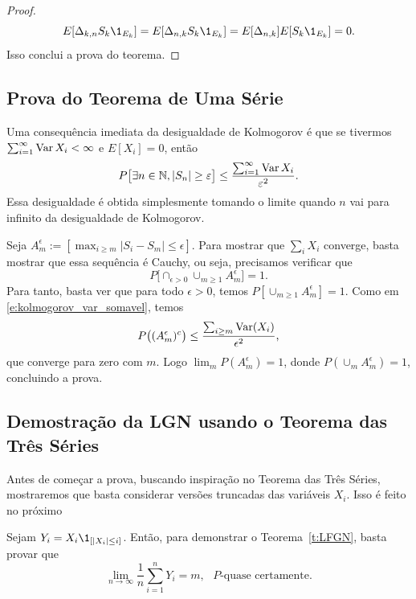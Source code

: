 \begin{topics}
\begin{proof}
 \begin{equation}
   E[ \Delta_{k,n} S_k \1_{E_k}]=E[\Delta_{n,k}S_k \1_{E_k}]=E[\Delta_{n,k}]E[S_k \1_{E_k}]=0.
 \end{equation}
 Isso conclui a prova do teorema.
\end{proof}

\subsection{Prova do Teorema de Uma Série}

Uma consequência imediata da desigualdade de Kolmogorov é que se tivermos $\sum_{i=1}^{\infty} \operatorname{Var} X_i<\infty$ e $E[X_i]=0$, então
\begin{equation}
  \label{e:kolmogorov_var_somavel}
  P \big[ \exists n\in {\ensuremath{\mathbb N}},  |S_n| \ge \varepsilon \big]
  \le \frac{\sum_{i=1}^{\infty} \operatorname{Var} X_i}{\varepsilon^2}.
\end{equation}
Essa desigualdade é obtida simplesmente tomando o limite quando $n$ vai para infinito da desigualdade de Kolmogorov.

Seja $A_m^\epsilon := [ \max_{i \geq m} |S_i - S_m| \leq \epsilon ]$.
Para mostrar que $\sum_{i} X_i$ converge, basta mostrar que essa sequência é Cauchy, ou seja, precisamos verificar que
\begin{equation}
  P \big[ \cap_{\epsilon > 0} \cup_{m \geq 1} A_m^\epsilon \big] = 1.
\end{equation}
Para tanto, basta ver que para todo $\epsilon > 0$, temos $P [\cup_{m \geq 1} A_m^\epsilon] = 1$.
Como em \eqref{e:kolmogorov_var_somavel}, temos
\begin{equation}
  P \big( (A_m^\epsilon)^c \big) \leq \frac{\sum_{i \geq m} \operatorname{Var}(X_i)}{\epsilon^2},
\end{equation}
que converge para zero com $m$.
Logo $\lim_m P(A_m^\epsilon) = 1$, donde $P(\cup_m A_m^\epsilon) = 1$, concluindo a prova.

\subsection{Demostração da LGN usando o Teorema das Três Séries}

Antes de começar a prova, buscando inspiração no Teorema das Três Séries, mostraremos que basta considerar versões truncadas das variáveis $X_i$.
Isso é feito no próximo

\begin{lemma}
  \label{l:LFGN}
  Sejam $Y_i = X_i \1_{[|X_i| \leq i]}$.
  Então, para demonstrar o Teorema~\ref{t:LFGN}, basta provar que
  \begin{equation}
    \lim_{n \to \infty}\frac{1}{n} \sum_{i=1}^n Y_i = m, \text{ $P$-quase certamente.}
  \end{equation}
\end{lemma}


\end{topics}
